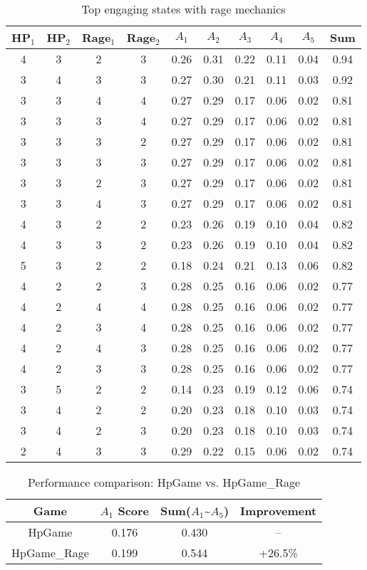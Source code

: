 \documentclass{article}
\begin{document}
\begin{table}[h]
\centering
\begin{tabular}{|c|c|c|c|c|c|c|c|c|c|}
\hline
HP$_1$ & HP$_2$ & Rage$_1$ & Rage$_2$ & $A_1$ & $A_2$ & $A_3$ & $A_4$ & $A_5$ & Sum \\
\hline
4 & 3 & 2 & 3 & 0.26 & 0.31 & 0.22 & 0.11 & 0.04 & 0.94 \\
3 & 4 & 3 & 3 & 0.27 & 0.30 & 0.21 & 0.11 & 0.03 & 0.92 \\
3 & 3 & 4 & 4 & 0.27 & 0.29 & 0.17 & 0.06 & 0.02 & 0.81 \\
3 & 3 & 3 & 4 & 0.27 & 0.29 & 0.17 & 0.06 & 0.02 & 0.81 \\
3 & 3 & 3 & 2 & 0.27 & 0.29 & 0.17 & 0.06 & 0.02 & 0.81 \\
3 & 3 & 3 & 3 & 0.27 & 0.29 & 0.17 & 0.06 & 0.02 & 0.81 \\
3 & 3 & 2 & 3 & 0.27 & 0.29 & 0.17 & 0.06 & 0.02 & 0.81 \\
3 & 3 & 4 & 3 & 0.27 & 0.29 & 0.17 & 0.06 & 0.02 & 0.81 \\
4 & 3 & 2 & 2 & 0.23 & 0.26 & 0.19 & 0.10 & 0.04 & 0.82 \\
4 & 3 & 3 & 2 & 0.23 & 0.26 & 0.19 & 0.10 & 0.04 & 0.82 \\
5 & 3 & 2 & 2 & 0.18 & 0.24 & 0.21 & 0.13 & 0.06 & 0.82 \\
4 & 2 & 2 & 3 & 0.28 & 0.25 & 0.16 & 0.06 & 0.02 & 0.77 \\
4 & 2 & 4 & 4 & 0.28 & 0.25 & 0.16 & 0.06 & 0.02 & 0.77 \\
4 & 2 & 3 & 4 & 0.28 & 0.25 & 0.16 & 0.06 & 0.02 & 0.77 \\
4 & 2 & 4 & 3 & 0.28 & 0.25 & 0.16 & 0.06 & 0.02 & 0.77 \\
4 & 2 & 3 & 3 & 0.28 & 0.25 & 0.16 & 0.06 & 0.02 & 0.77 \\
3 & 5 & 2 & 2 & 0.14 & 0.23 & 0.19 & 0.12 & 0.06 & 0.74 \\
3 & 4 & 2 & 2 & 0.20 & 0.23 & 0.18 & 0.10 & 0.03 & 0.74 \\
3 & 4 & 2 & 3 & 0.20 & 0.23 & 0.18 & 0.10 & 0.03 & 0.74 \\
2 & 4 & 3 & 3 & 0.29 & 0.22 & 0.15 & 0.06 & 0.02 & 0.74 \\
\hline
\end{tabular}
\caption{Top engaging states with rage mechanics}
\end{table}

\begin{table}[h]
\centering
\begin{tabular}{|c|c|c|c|}
\hline
Game & $A_1$ Score & Sum($A_1$\textasciitilde$A_5$) & Improvement \\
\hline
HpGame & 0.176 & 0.430 & -- \\
HpGame\_Rage & 0.199 & 0.544 & +26.5\% \\
\hline
\end{tabular}
\caption{Performance comparison: HpGame vs. HpGame\_Rage}
\end{table}
\end{document}
